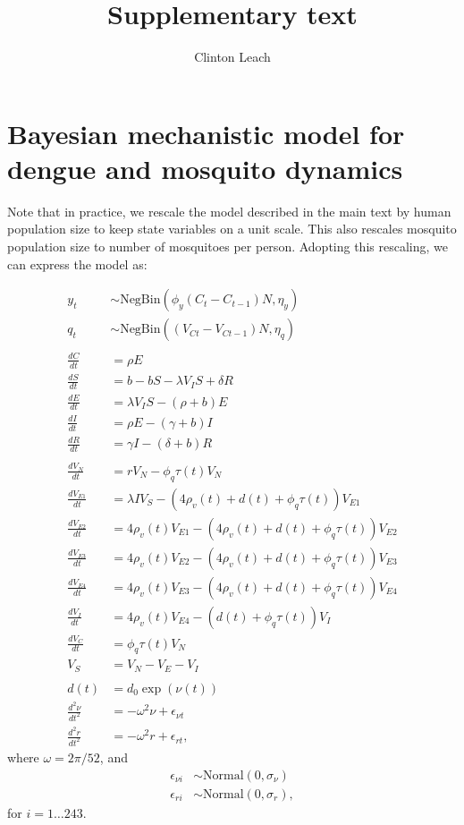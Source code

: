 \documentclass[12pt,letterpaper]{article}
\title{Supplementary text}
\author{Clinton Leach}
\begin{document}
\maketitle


\section*{Bayesian mechanistic model for dengue and mosquito dynamics}

Note that in practice, we rescale the model described in the main text by human population size to keep state variables on a unit scale.
This also rescales mosquito population size to number of mosquitoes per person.
Adopting this rescaling, we can express the model as:

\begin{align}
y_t & \sim \text{NegBin}(\phi_y  (C_t - C_{t-1})N, \eta_y)\\
q_t & \sim \text{NegBin}((V_{Ct} - V_{Ct-1})N, \eta_q)\\
\\
\frac{dC}{dt} &= \rho E \\
\frac{dS}{dt} &= b - bS - \lambda V_{I}S + \delta R\\
\frac{dE}{dt} &= \lambda V_{I}S - (\rho + b)E\\
\frac{dI}{dt} &= \rho E - (\gamma + b)I\\
\frac{dR}{dt} &= \gamma I - (\delta + b)R\\
\\
\frac{dV_N}{dt} & = r V_N - \phi_q \tau(t) V_N\\
\frac{dV_{E1}}{dt} &= \lambda I V_S - (4\rho_{v}(t) + d(t) + \phi_q \tau(t))V_{E1}\\
\frac{dV_{E2}}{dt} &= 4\rho_{v}(t) V_{E1} - (4\rho_{v}(t) + d(t) + \phi_q \tau(t))V_{E2}\\
\frac{dV_{E3}}{dt} &= 4\rho_{v}(t) V_{E2}  - (4\rho_{v}(t) + d(t) + \phi_q \tau(t))V_{E3}\\
\frac{dV_{E4}}{dt} &= 4\rho_{v}(t) V_{E3}  - (4\rho_{v}(t) + d(t) + \phi_q \tau(t))V_{E4}\\\frac{dV_I}{dt} &= 4\rho_{v}(t) V_{E4} - (d(t) + \phi_q \tau(t)) V_I\\
\frac{dV_C}{dt} & = \phi_q \tau(t) V_N\\
V_S &= V_N - V_E - V_I\\
\\
d(t) &= d_0 \exp(\nu(t))\\
\frac{d^2\nu}{dt^2} &= -\omega^2 \nu + \epsilon_{\nu t}\\
\frac{d^2 r}{dt^2} &= -\omega^2 r + \epsilon_{rt},
\end{align}
where $\omega = 2\pi / 52$, and
\begin{align}
\epsilon_{\nu i} & \sim \text{Normal}(0, \sigma_{\nu})\\
\epsilon_{ri} & \sim \text{Normal}(0, \sigma_r),
\end{align}
for $i = 1 \dots 243$.
\end{document}
